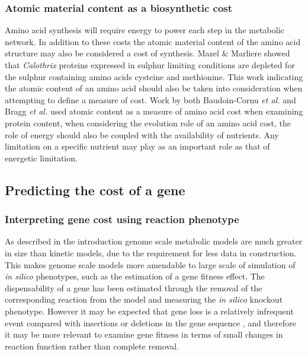 \subsubsection{Atomic material content as a biosynthetic cost}%

Amino acid synthesis will require energy to power each step in the metabolic network. In addition to these costs the atomic material content of the amino acid structure may also be considered a cost of synthesis. Mazel \& Marliere \cite{mazel1989} showed that \emph{Calothrix} proteins expressed in sulphur limiting conditions are depleted for the sulphur containing amino acids cysteine and methionine. This work indicating the atomic content of an amino acid should also be taken into consideration when attempting to define a measure of cost. Work by both Baudoin-Cornu \emph{et al.} \cite{baudoin2001} and Bragg \emph{et al.} \cite{bragg2006} used atomic content as a measure of amino acid cost when examining protein content, when considering the evolution role of an amino acid cost, the role of energy should also be coupled with the availability of nutrients. Any limitation on a specific nutrient may play as an important role as that of energetic limitation.

\subsection{Predicting the cost of a gene}%

\subsubsection{Interpreting gene cost using reaction phenotype} %

As described in the introduction genome scale metabolic models are much greater in size than kinetic models, due to the requirement for less data in construction. This makes genome scale models more amendable to large scale of simulation of \emph{in silico} phenotypes, such as the estimation of a gene fitness effect. The dispensability of a gene has been estimated through the removal of the corresponding reaction from the model and measuring the \emph{in silico} knockout phenotype. However it may be expected that gene loss is a relatively infrequent event compared with insertions or deletions in the gene sequence \cite{pal2006}, and therefore it may be more relevant to examine gene fitness in terms of small changes in reaction function rather than complete removal.


